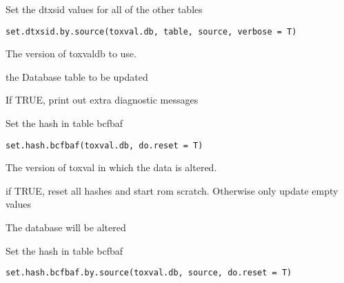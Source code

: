 \documentclass[letterpaper]{book}
\begin{document}
%
\begin{Description}\relax
Set the dtxsid values for all of the other tables
\end{Description}
%
\begin{Usage}
\begin{verbatim}
set.dtxsid.by.source(toxval.db, table, source, verbose = T)
\end{verbatim}
\end{Usage}
%
\begin{Arguments}
\begin{ldescription}
\item[\code{toxval.db}] The version of toxvaldb to use.

\item[\code{table}] the Database table to be updated

\item[\code{verbose}] If TRUE, print out extra diagnostic messages
\end{ldescription}
\end{Arguments}
%
\begin{Description}\relax
Set the hash in table bcfbaf
\end{Description}
%
\begin{Usage}
\begin{verbatim}
set.hash.bcfbaf(toxval.db, do.reset = T)
\end{verbatim}
\end{Usage}
%
\begin{Arguments}
\begin{ldescription}
\item[\code{toxval.db}] The version of toxval in which the data is altered.

\item[\code{do.reset}] if TRUE, reset all hashes and start rom scratch.
Otherwise only update empty values
\end{ldescription}
\end{Arguments}
%
\begin{Value}
The database will be altered
\end{Value}
%
\begin{Description}\relax
Set the hash in table bcfbaf
\end{Description}
%
\begin{Usage}
\begin{verbatim}
set.hash.bcfbaf.by.source(toxval.db, source, do.reset = T)
\end{verbatim}
\end{Usage}
\end{document}
